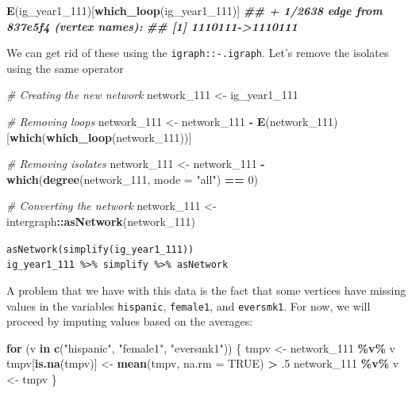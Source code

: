 \documentclass[
]{book}
\newenvironment{Shaded}{\begin{snugshade}}{\end{snugshade}}
\newcommand{\AttributeTok}[1]{\textcolor[rgb]{0.13,0.29,0.53}{#1}}
\newcommand{\CommentTok}[1]{\textcolor[rgb]{0.56,0.35,0.01}{\textit{#1}}}
\newcommand{\ConstantTok}[1]{\textcolor[rgb]{0.56,0.35,0.01}{#1}}
\newcommand{\ControlFlowTok}[1]{\textcolor[rgb]{0.13,0.29,0.53}{\textbf{#1}}}
\newcommand{\DecValTok}[1]{\textcolor[rgb]{0.00,0.00,0.81}{#1}}
\newcommand{\DocumentationTok}[1]{\textcolor[rgb]{0.56,0.35,0.01}{\textbf{\textit{#1}}}}
\newcommand{\FunctionTok}[1]{\textcolor[rgb]{0.13,0.29,0.53}{\textbf{#1}}}
\newcommand{\NormalTok}[1]{#1}
\newcommand{\OtherTok}[1]{\textcolor[rgb]{0.56,0.35,0.01}{#1}}
\newcommand{\SpecialCharTok}[1]{\textcolor[rgb]{0.81,0.36,0.00}{\textbf{#1}}}
\newcommand{\StringTok}[1]{\textcolor[rgb]{0.31,0.60,0.02}{#1}}
\begin{document}
\begin{Shaded}
\begin{Highlighting}[]
\FunctionTok{E}\NormalTok{(ig\_year1\_111)[}\FunctionTok{which\_loop}\NormalTok{(ig\_year1\_111)]}
\DocumentationTok{\#\# + 1/2638 edge from 837e5f4 (vertex names):}
\DocumentationTok{\#\# [1] 1110111{-}\textgreater{}1110111}
\end{Highlighting}
\end{Shaded}

We can get rid of these using the \texttt{igraph::-.igraph}. Let's remove the isolates using the same operator

\begin{Shaded}
\begin{Highlighting}[]
\CommentTok{\# Creating the new network}
\NormalTok{network\_111 }\OtherTok{\textless{}{-}}\NormalTok{ ig\_year1\_111}

\CommentTok{\# Removing loops}
\NormalTok{network\_111 }\OtherTok{\textless{}{-}}\NormalTok{ network\_111 }\SpecialCharTok{{-}} \FunctionTok{E}\NormalTok{(network\_111)[}\FunctionTok{which}\NormalTok{(}\FunctionTok{which\_loop}\NormalTok{(network\_111))]}

\CommentTok{\# Removing isolates}
\NormalTok{network\_111 }\OtherTok{\textless{}{-}}\NormalTok{ network\_111 }\SpecialCharTok{{-}} \FunctionTok{which}\NormalTok{(}\FunctionTok{degree}\NormalTok{(network\_111, }\AttributeTok{mode =} \StringTok{"all"}\NormalTok{) }\SpecialCharTok{==} \DecValTok{0}\NormalTok{)}

\CommentTok{\# Converting the network}
\NormalTok{network\_111 }\OtherTok{\textless{}{-}}\NormalTok{ intergraph}\SpecialCharTok{::}\FunctionTok{asNetwork}\NormalTok{(network\_111)}
\end{Highlighting}
\end{Shaded}

\texttt{asNetwork(simplify(ig\_year1\_111))}
\texttt{ig\_year1\_111\ \%\textgreater{}\%\ simplify\ \%\textgreater{}\%\ asNetwork}

A problem that we have with this data is the fact that some vertices have missing values in the variables \texttt{hispanic}, \texttt{female1}, and \texttt{eversmk1}. For now, we will proceed by imputing values based on the averages:

\begin{Shaded}
\begin{Highlighting}[]
\ControlFlowTok{for}\NormalTok{ (v }\ControlFlowTok{in} \FunctionTok{c}\NormalTok{(}\StringTok{"hispanic"}\NormalTok{, }\StringTok{"female1"}\NormalTok{, }\StringTok{"eversmk1"}\NormalTok{)) \{}
\NormalTok{  tmpv }\OtherTok{\textless{}{-}}\NormalTok{ network\_111 }\SpecialCharTok{\%v\%}\NormalTok{ v}
\NormalTok{  tmpv[}\FunctionTok{is.na}\NormalTok{(tmpv)] }\OtherTok{\textless{}{-}} \FunctionTok{mean}\NormalTok{(tmpv, }\AttributeTok{na.rm =} \ConstantTok{TRUE}\NormalTok{) }\SpecialCharTok{\textgreater{}}\NormalTok{ .}\DecValTok{5}
\NormalTok{  network\_111 }\SpecialCharTok{\%v\%}\NormalTok{ v }\OtherTok{\textless{}{-}}\NormalTok{ tmpv}
\NormalTok{\}}
\end{Highlighting}
\end{Shaded}
\end{document}
